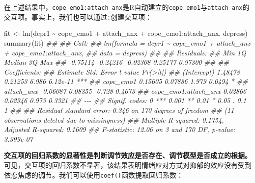 \documentclass[
  chinese-hans,
  letterpaper,
  DIV=11,
  numbers=noendperiod]{scrartcl}
\newenvironment{Shaded}{\begin{snugshade}}{\end{snugshade}}
\newcommand{\DocumentationTok}[1]{\textcolor[rgb]{0.37,0.37,0.37}{\textit{#1}}}
\newcommand{\FunctionTok}[1]{\textcolor[rgb]{0.28,0.35,0.67}{#1}}
\newcommand{\NormalTok}[1]{\textcolor[rgb]{0.00,0.23,0.31}{#1}}
\newcommand{\OtherTok}[1]{\textcolor[rgb]{0.00,0.23,0.31}{#1}}
\newcommand{\SpecialCharTok}[1]{\textcolor[rgb]{0.37,0.37,0.37}{#1}}
\begin{document}
在上述结果中，\texttt{cope\_emo1:attach\_anx}是R自动建立的\texttt{cope\_emo1}与\texttt{attach\_anx}的交互项。事实上，我们也可以通过\texttt{:}创建交互项：

\begin{Shaded}
\begin{Highlighting}[numbers=left,,]
\NormalTok{fit }\OtherTok{\textless{}{-}} \FunctionTok{lm}\NormalTok{(depr1 }\SpecialCharTok{\textasciitilde{}}\NormalTok{ cope\_emo1 }\SpecialCharTok{+}\NormalTok{ attach\_anx }\SpecialCharTok{+}\NormalTok{ cope\_emo1}\SpecialCharTok{:}\NormalTok{attach\_anx, depress)}
\FunctionTok{summary}\NormalTok{(fit)}
\DocumentationTok{\#\# }
\DocumentationTok{\#\# Call:}
\DocumentationTok{\#\# lm(formula = depr1 \textasciitilde{} cope\_emo1 + attach\_anx + cope\_emo1:attach\_anx, }
\DocumentationTok{\#\#     data = depress)}
\DocumentationTok{\#\# }
\DocumentationTok{\#\# Residuals:}
\DocumentationTok{\#\#      Min       1Q   Median       3Q      Max }
\DocumentationTok{\#\# {-}0.75114 {-}0.24216 {-}0.02308  0.25177  0.97300 }
\DocumentationTok{\#\# }
\DocumentationTok{\#\# Coefficients:}
\DocumentationTok{\#\#                      Estimate Std. Error t value Pr(\textgreater{}|t|)    }
\DocumentationTok{\#\# (Intercept)           1.48478    0.21253   6.986 6.12e{-}11 ***}
\DocumentationTok{\#\# cope\_emo1             0.15605    0.07886   1.979   0.0494 *  }
\DocumentationTok{\#\# attach\_anx           {-}0.06087    0.08355  {-}0.728   0.4673    }
\DocumentationTok{\#\# cope\_emo1:attach\_anx  0.02866    0.02946   0.973   0.3321    }
\DocumentationTok{\#\# {-}{-}{-}}
\DocumentationTok{\#\# Signif. codes:  0 \textquotesingle{}***\textquotesingle{} 0.001 \textquotesingle{}**\textquotesingle{} 0.01 \textquotesingle{}*\textquotesingle{} 0.05 \textquotesingle{}.\textquotesingle{} 0.1 \textquotesingle{} \textquotesingle{} 1}
\DocumentationTok{\#\# }
\DocumentationTok{\#\# Residual standard error: 0.346 on 170 degrees of freedom}
\DocumentationTok{\#\#   (11 observations deleted due to missingness)}
\DocumentationTok{\#\# Multiple R{-}squared:  0.1754, Adjusted R{-}squared:  0.1609 }
\DocumentationTok{\#\# F{-}statistic: 12.06 on 3 and 170 DF,  p{-}value: 3.399e{-}07}
\end{Highlighting}
\end{Shaded}

\textbf{交互项的回归系数的显著性是判断调节效应是否存在、调节模型是否成立的根据。}可见，交互项的回归系数不显著，该结果表明情绪应对方式对抑郁的效应没有受到依恋焦虑的调节。我们可以使用\texttt{coef()}函数提取回归系数：
\end{document}
